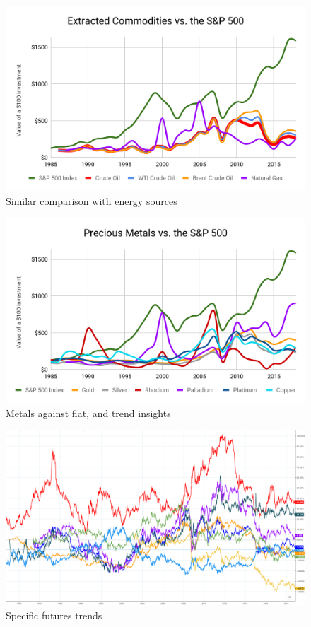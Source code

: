 \documentclass{article}
\begin{document}
\begin{figure}[!htb]
    \centering
    \includegraphics[width=\textwidth]{imgs/19.png}
    \caption{Similar comparison with energy sources}
\end{figure}

\vspace{10pt}

\begin{figure}[!htb]
    \centering
    \includegraphics[width=\textwidth]{imgs/20.png}
    \caption{Metals against fiat, and trend insights}
\end{figure}

\vspace{10pt}

\begin{figure}[!htb]
    \centering
    \includegraphics[width=\textwidth]{imgs/21.png}
    \caption{Specific futures trends}
\end{figure}
\end{document}
